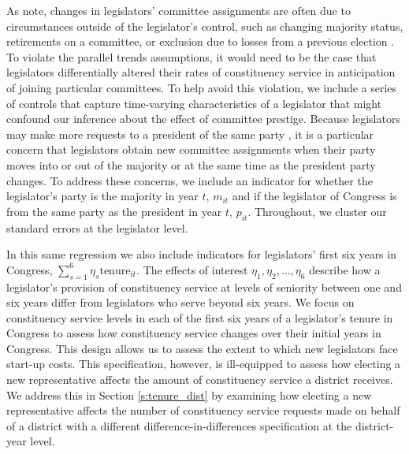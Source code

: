 \documentclass[12pt]{article}
\begin{document}
As \cite{BerryFowler2016} note, changes in legislators' committee assignments are often due to circumstances outside of the legislator's control, such as changing majority status, retirements on a committee, or exclusion due to losses from a previous election \citep{GrimmerPowell2013}. To violate the parallel trends assumptions, it would need to be the case that legislators differentially altered their rates of constituency service in anticipation of joining particular committees. To help avoid this violation, we include a series of controls that capture time-varying characteristics of a legislator that might confound our inference about the effect of committee prestige. Because legislators may make more requests to a president of the same party \citep{BerryBurdenHowell09}, it is a particular concern that legislators obtain new committee assignments when their party moves into or out of the majority or at the same time as the president party changes. To address these concerns, we include an indicator for whether the legislator's party is the majority in year $t$, $m_{it}$ and if the legislator of Congress is from the same party as the president in year $t$, $p_{it}$. Throughout, we cluster our standard errors at the legislator level.

In this same regression we also include indicators for legislators' first six years in Congress, $ \sum_{s = 1}^{6} \eta_{s} \text{tenure}_{it}$. The effects of interest $\eta_{1}, \eta_{2}, \hdots, \eta_{6}$ describe how a legislator's provision of constituency service at levels of seniority between one and six years differ from legislators who serve beyond six years. We focus on constituency service levels in each of the first six years of a legislator's tenure in Congress to assess how constituency service changes over their initial years in Congress. This design allows us to assess the extent to which new legislators face start-up costs. This specification, however, is ill-equipped to assess how electing a new representative affects the amount of constituency service a district receives. We address this in Section \ref{s:tenure_dist} by examining how electing a new representative affects the number of constituency service requests made on behalf of a district with a different difference-in-differences specification at the district-year level.   

\end{document}

